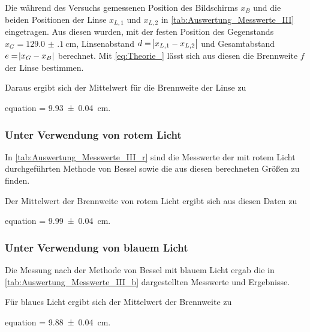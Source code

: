 		Die während des Versuchs gemessenen Position des Bildschirms $x_{B}$ und
		die beiden Positionen der Linse $x_{L,1}$ und $x_{L,2}$ in \cref{tab:Auswertung_Messwerte_III} eingetragen. 
		Aus diesen wurden, mit der festen Position des Gegenstands $x_{G} = \SI{129.0(1)}{\centi\meter}$,
		Linsenabstand $d = \envert{x_{L,1} - x_{L,2}}$ und Gesamtabstand $e = \envert{x_{G}- x_{B}}$ 
		berechnet. Mit \cref{eq:Theorie_} lässt sich aus diesen die Brennweite $f$ der Linse bestimmen.
		
		
		
		Daraus ergibt sich der Mittelwert für die Brennweite der Linse zu
		\begin{empheq}{equation}
			\label{val:Auswertung_BesselWeis}
			 = \SI{9.93(4)}{\centi\meter}.
		\end{empheq}
		
	\subsubsection{Unter Verwendung von rotem Licht}	
		
		In \cref{tab:Auswertung_Messwerte_III_r} sind die Messwerte der mit rotem
		Licht durchgeführten Methode von Bessel sowie die aus diesen berechneten
		Größen zu finden.
		
		
		
		 Der Mittelwert der Brennweite von rotem Licht ergibt sich aus diesen Daten zu
		\begin{empheq}{equation}
			\label{val:Auswertung_BesselRot}
			 = \SI{9.99(4)}{\centi\meter}.
		\end{empheq}		 
		
	
	\subsubsection{Unter Verwendung von blauem Licht}	
		
		Die Messung nach der Methode von Bessel mit blauem Licht ergab die 
		in \cref{tab:Auswertung_Messwerte_III_b}  dargestellten Messwerte und Ergebnisse.	
		
				
		
		Für blaues Licht ergibt sich der Mittelwert der Brennweite zu
		\begin{empheq}{equation}
			\label{val:Auswertung_BesselBlau}
			 = \SI{9.88(4)}{\centi\meter}.
		\end{empheq}		
		
